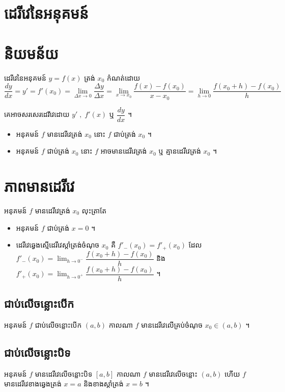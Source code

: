 \documentclass[a4paper,12pt]{article}
\begin{document}
\section*{\centering \huge ដេរីវេនៃអនុគមន៍}
\section{និយមន័យ}
\begin{definition}
	ដេរីវេនៃអនុគមន៍ $y=f(x)$ ត្រង់ $x_0$ កំណត់ដោយ $$\dfrac{dy}{dx}=y'=f'(x_0)=\lim_{\Delta x \to 0} \dfrac{\Delta y}{\Delta x}=\lim _{x\to x_0}\dfrac{f(x)-f(x_0)}{x-x_0}=\lim_{h\to 0}\dfrac{f(x_0+h)-f(x_0)}{h}$$
\end{definition}
\begin{notation}
	គេអាចសរសេរដេរីវេដោយ $y' \;, \; f'(x)$ ឬ $\dfrac{dy}{dx}$ ។
\end{notation}
\begin{itemize}
	\item អនុគមន៍ $f$ មានដេរីវេត្រង់ $x_0$ នោះ $f$ ជាប់ត្រង់ $x_0$ ។
	\item អនុគមន៍ $f$ ជាប់ត្រង់ $x_0$ នោះ $f$ អាចមានដេរីវេត្រង់ $x_0$ ឬ គ្មានដេរីវេត្រង់ $x_0$ ។
\end{itemize}
\section{ភាពមានដេរីវេ}
\begin{definition}
	អនុគមន៍ $f$ មានដេរីវេត្រង់ $x_0$ លុះត្រាតែ
	\begin{itemize}
		\item អនុគមន៍ $f$ ជាប់ត្រង់ $x=0$ ។
		\item ដេរីវេឆ្វេងស្មើដេរីវេស្តាំត្រង់ចំណុច $x_0$ គឺ $f'_-(x_0)=f'_+(x_0)$ ដែល \\
		      $f'_-(x_0)=\lim_{h\to 0^-}\dfrac{f(x_0+h)-f(x_0)}{h}$ និង $f'_+(x_0)=\lim_{h\to 0^+}\dfrac{f(x_0+h)-f(x_0)}{h}$ ។
	\end{itemize}
\end{definition}
\subsection{ជាប់លើចន្លោះបើក}
\begin{definition}
	អនុគមន៍ $f$ ជាប់លើចន្លោះបើក $(a,b)$ កាលណា $f$ មានដេរីវេលើគ្រប់ចំណុច $x_0\in (a,b)$ ។
\end{definition}
\subsection{ជាប់លើចន្លោះបិទ}
\begin{definition}
	អនុគមន៍ $f$ មានដេរីវេលើចន្លោះបិទ $[a,b]$ កាលណា $f$ មានដេរីវេលើចន្លោះ $(a,b)$ ហើយ $f$
	មានដេរីវេខាងឆ្វេងត្រង់ $x=a$ និងខាងស្តាំត្រង់ $x=b$ ។
\end{definition}
\end{document}

